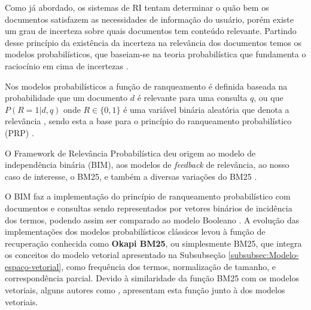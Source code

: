     Como já abordado, os sistemas de RI tentam determinar o quão bem os documentos satisfazem as necessidades de informação do usuário, porém existe um grau de incerteza sobre quais documentos tem conteúdo relevante. 
    Partindo desse princípio da existência da incerteza na relevância dos documentos temos os modelos probabilísticos, que baseiam-se na teoria probabilística que fundamenta o raciocínio em cima de incertezas \cite[p.~201]{Manning2008IIR}. 
    
    Nos modelos probabilísticos a função de ranqueamento é definida baseada na probabilidade que um documento $d$ é relevante para uma consulta $q$, ou que $P(R = 1| d,q)$ onde $R \in \{0, 1\}$ é uma variável binária aleatória que denota a relevância \cite[p.~111--112]{Zhai2016TDMA}, sendo esta a base para o princípio do ranqueamento probabilístico (PRP) \cite[p.~203]{Manning2008IIR}.
    
    O Framework de Relevância Probabilística deu origem ao modelo de independência binária (BIM), aos modelos de \textit{feedback} de relevância, ao nosso caso de interesse, o BM25, e também a diversas variações do BM25 \cite{robertson_probabilistic_2010}. 
    
    O BIM faz a implementação do princípio de ranqueamento probabilístico com documentos e consultas sendo representados por vetores binários de incidência dos termos, podendo assim ser comparado ao modelo Booleano \cite[p.~204]{Manning2008IIR}.
    A evolução das implementações dos modelos probabilísticos clássicos levou à função de recuperação conhecida como \textbf{Okapi BM25}, ou simplesmente BM25, que integra os conceitos do modelo vetorial apresentado na Subsubseção \ref{subsubsec:Modelo-espaço-vetorial}, como frequência dos termos, normalização de tamanho, e correspondência parcial.
    Devido à similaridade da função BM25 com os modelos vetoriais, alguns autores como , apresentam esta função junto à dos modelos vetoriais.
    
    
